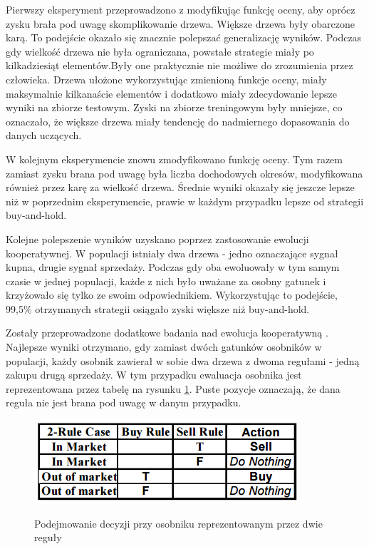 \documentclass[twoside]{iisthesis}
\begin{document}
Pierwszy eksperyment przeprowadzono z modyfikując funkcję oceny, aby oprócz zysku brała pod uwagę skomplikowanie drzewa. Większe drzewa były obarczone karą. To podejście okazało się znacznie polepszać generalizację wyników. Podczas gdy wielkość drzewa nie była ograniczana, powstałe strategie miały po kilkadziesiąt elementów.Były one praktycznie nie możliwe do zrozumienia przez człowieka. Drzewa ułożone wykorzystując zmienioną funkcje oceny, miały maksymalnie kilkanaście elementów i dodatkowo miały zdecydowanie lepsze wyniki na zbiorze testowym. Zyski na zbiorze treningowym były mniejsze, co oznaczało, że większe drzewa miały tendencję do nadmiernego dopasowania do danych uczących. 

W kolejnym eksperymencie znowu zmodyfikowano funkcję oceny. Tym razem zamiast zysku brana pod uwagę była liczba dochodowych okresów, modyfikowana również przez karę za wielkość drzewa. Średnie wyniki okazały się jeszcze lepsze niż w poprzednim eksperymencie, prawie w każdym przypadku lepsze od strategii buy-and-hold.

Kolejne polepszenie wyników uzyskano poprzez zastosowanie ewolucji kooperatywnej. W populacji istniały dwa drzewa - jedno oznaczające sygnał kupna, drugie sygnał sprzedaży. Podczas gdy oba ewoluowały w tym samym czasie w jednej populacji, każde z nich było uważane za osobny gatunek i krzyżowało się tylko ze swoim odpowiednikiem. Wykorzystując to podejście, 99,5\% otrzymanych strategii osiągało zyski większe niż buy-and-hold.

Zostały przeprowadzone dodatkowe badania nad ewolucja kooperatywną \cite{Becker03cooperativecoevolution}. Najlepsze wyniki otrzymano, gdy zamiast dwóch gatunków osobników w populacji, każdy osobnik zawierał w sobie dwa drzewa z dwoma regułami - jedną zakupu drugą sprzedaży. W tym przypadku ewaluacja osobnika jest reprezentowana przez tabelę na rysunku \ref{fig:koewolucja}. Puste pozycje oznaczają, że dana reguła nie jest brana pod uwagę w danym przypadku.

\begin{figure}[h]
\center
\caption {Podejmowanie decyzji przy osobniku reprezentowanym przez dwie reguły}
\includegraphics{koewolucja}
\label{fig:koewolucja}
\end{figure}
\end{document}
